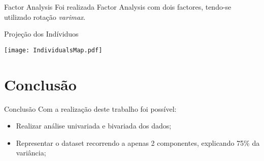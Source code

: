 \documentclass[xcolor=dvipsnames,table]{beamer}
\begin{document}
	\begin{frame}{Factor Analysis}
	    Foi realizada Factor Analysis com dois factores, tendo-se utilizado rotação \textit{varimax}.
	    
		\begin{table}[h]
        \centering
        \end{table}
	
	
	\end{frame}
	
	
	\begin{frame}{Projeção dos Indíviduos}
	   
		\begin{center}
    	\texttt{[image: IndividualsMap.pdf]}
  		\end{center}
	
	\end{frame}
	
	\section{Conclusão}
	\begin{frame}{Conclusão}
	Com a realização deste trabalho foi possível:
	    \begin{itemize}
	        \item Realizar análise univariada e bivariada dos dados;
	        
	        \item Representar o dataset recorrendo a apenas 2 componentes, explicando 75\% da variância;
	        
	    \end{itemize}
	\end{frame}
	

	
	
	
	

	
\end{document}

